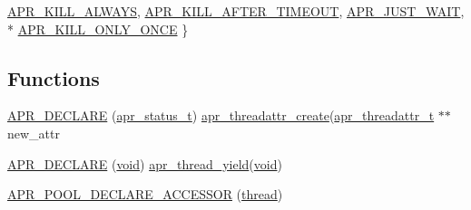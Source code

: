 \begin{DoxyCompactItemize}
\hyperlink{group__apr__thread__proc_gga3eaec78633742e7e0cb9480a21477affaf45d0f72811399b394d1311384e2dfe4}{A\+P\+R\+\_\+\+K\+I\+L\+L\+\_\+\+A\+L\+W\+A\+YS}, 
\hyperlink{group__apr__thread__proc_gga3eaec78633742e7e0cb9480a21477affa16a47aa786b1c1f31ef02353bcae9a1a}{A\+P\+R\+\_\+\+K\+I\+L\+L\+\_\+\+A\+F\+T\+E\+R\+\_\+\+T\+I\+M\+E\+O\+UT}, 
\hyperlink{group__apr__thread__proc_gga3eaec78633742e7e0cb9480a21477affa6ada2605856ac94826edbe824e64e503}{A\+P\+R\+\_\+\+J\+U\+S\+T\+\_\+\+W\+A\+IT}, 
\\*
\hyperlink{group__apr__thread__proc_gga3eaec78633742e7e0cb9480a21477affa24d6f47785093be4cea2a922eeaed098}{A\+P\+R\+\_\+\+K\+I\+L\+L\+\_\+\+O\+N\+L\+Y\+\_\+\+O\+N\+CE}
 \}
\end{DoxyCompactItemize}
\subsection*{Functions}
\begin{DoxyCompactItemize}
\item 
\hyperlink{group__apr__thread__proc_ga084f81b7d0ad48c8f325486234671331}{A\+P\+R\+\_\+\+D\+E\+C\+L\+A\+RE} (\hyperlink{group__apr__errno_gaa5105fa83cc322f09382292db8b47593}{apr\+\_\+status\+\_\+t}) \hyperlink{netware_2thread_8c_ad8a75134b8a7aa1160ca49688ade415b}{apr\+\_\+threadattr\+\_\+create}(\hyperlink{structapr__threadattr__t}{apr\+\_\+threadattr\+\_\+t} $\ast$$\ast$new\+\_\+attr
\item 
\hyperlink{group__apr__thread__proc_gadb02fec9a7a5eb611865dc4821b804e4}{A\+P\+R\+\_\+\+D\+E\+C\+L\+A\+RE} (\hyperlink{group__MOD__ISAPI_gacd6cdbf73df3d9eed42fa493d9b621a6}{void}) \hyperlink{os2_2thread_8c_a2cb133ebee45c76ad9a22e23c2449a15}{apr\+\_\+thread\+\_\+yield}(\hyperlink{group__MOD__ISAPI_gacd6cdbf73df3d9eed42fa493d9b621a6}{void})
\item 
\hyperlink{group__apr__thread__proc_gad853cbf0f67be2f8d0b2e05aadc59fd8}{A\+P\+R\+\_\+\+P\+O\+O\+L\+\_\+\+D\+E\+C\+L\+A\+R\+E\+\_\+\+A\+C\+C\+E\+S\+S\+OR} (\hyperlink{group__apr__thread__proc_ga188dd007cf9d8f4d1f258aaf0bc2c2c9}{thread})
\end{DoxyCompactItemize}
